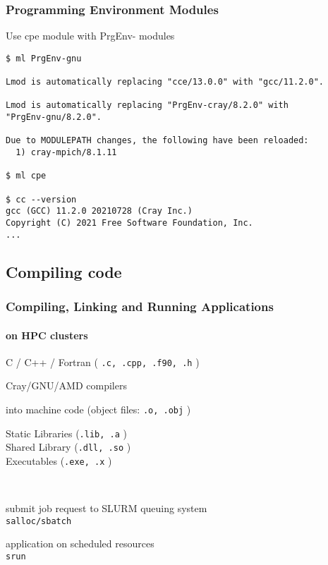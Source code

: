 \begin{frame}[fragile]
\frametitle{Programming Environment Modules}
    \begin{exampleblock}{ Use cpe module with PrgEnv- modules }
    \footnotesize
    \begin{verbatim}
$ ml PrgEnv-gnu

Lmod is automatically replacing "cce/13.0.0" with "gcc/11.2.0".

Lmod is automatically replacing "PrgEnv-cray/8.2.0" with 
"PrgEnv-gnu/8.2.0".

Due to MODULEPATH changes, the following have been reloaded:
  1) cray-mpich/8.1.11

$ ml cpe

$ cc --version
gcc (GCC) 11.2.0 20210728 (Cray Inc.)
Copyright (C) 2021 Free Software Foundation, Inc.
...
    \end{verbatim}
    \end{exampleblock}
\end{frame}


\subsection{Compiling code}
\begin{frame}[fragile]
\frametitle{Compiling, Linking and Running Applications}
\framesubtitle{on HPC clusters}
 \begin{description}
    \item [source code] C / C++ / Fortran ( \verb|.c, .cpp, .f90, .h|  )
    \item [compile] Cray/GNU/AMD compilers
    \item [assemble] into machine code (object files: \verb|.o, .obj| )
    \item [link] Static Libraries (\verb|.lib, .a|  ) \\ Shared Library (\verb|.dll, .so| ) \\ Executables (\verb|.exe, .x| )
    \item ~ 
    \item [request allocation] submit job request to SLURM queuing system \\ \verb|salloc/sbatch|
    \item [run] application on scheduled resources \\ \verb|srun|
 \end{description}
\end{frame}

